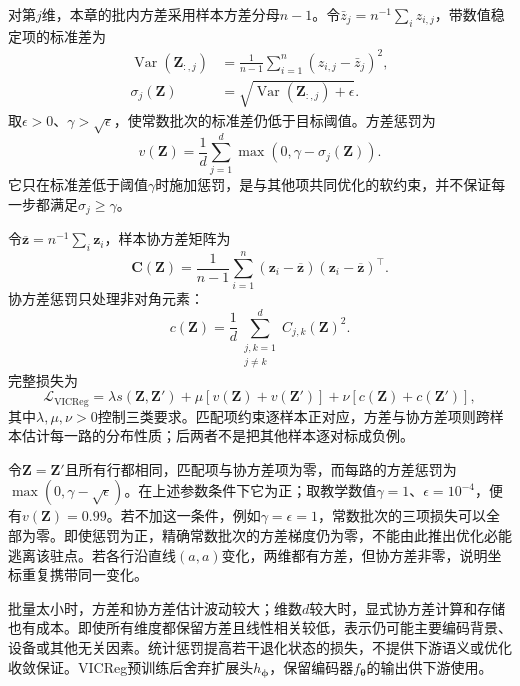 对第$j$维，本章的批内方差采用样本方差分母$n-1$。令$\bar z_j=n^{-1}\sum_i z_{i,j}$，带数值稳定项的标准差为
\[
  \begin{aligned}
    \operatorname{Var}(\bm{Z}_{:,j})
    &=\frac{1}{n-1}\sum_{i=1}^{n}(z_{i,j}-\bar z_j)^2,\\
    \sigma_j(\bm{Z})
    &=\sqrt{\operatorname{Var}(\bm{Z}_{:,j})+\epsilon}.
  \end{aligned}
\]
取$\epsilon>0$、$\gamma>\sqrt{\epsilon}$，使常数批次的标准差仍低于目标阈值。方差惩罚为
\begin{equation}
  v(\bm{Z})
  =\frac{1}{d}\sum_{j=1}^{d}\max(0,\gamma-\sigma_j(\bm{Z})).
  \label{eq:data-derived-knowledge-vicreg-variance}
\end{equation}
它只在标准差低于阈值$\gamma$时施加惩罚，是与其他项共同优化的软约束，并不保证每一步都满足$\sigma_j\geq\gamma$。

令$\overline{\bm{z}}=n^{-1}\sum_i\bm{z}_i$，样本协方差矩阵为
\[
  \bm{C}(\bm{Z})
  =\frac{1}{n-1}\sum_{i=1}^{n}
  (\bm{z}_i-\overline{\bm{z}})
  (\bm{z}_i-\overline{\bm{z}})^{\top}.
\]
协方差惩罚只处理非对角元素：
\begin{equation}
  c(\bm{Z})
  =\frac{1}{d}\sum_{\substack{j,k=1\\j\neq k}}^{d}C_{j,k}(\bm{Z})^2.
  \label{eq:data-derived-knowledge-vicreg-covariance}
\end{equation}
完整损失为
\begin{equation}
  \mathcal{L}_{\mathrm{VICReg}}
  =\lambda s(\bm{Z},\bm{Z}')
  +\mu\!\left[v(\bm{Z})+v(\bm{Z}')\right]
  +\nu\!\left[c(\bm{Z})+c(\bm{Z}')\right],
  \label{eq:data-derived-knowledge-vicreg}
\end{equation}
其中$\lambda,\mu,\nu>0$控制三类要求。匹配项约束逐样本正对应，方差与协方差项则跨样本估计每一路的分布性质；后两者不是把其他样本逐对标成负例。

令$\bm{Z}=\bm{Z}'$且所有行都相同，匹配项与协方差项为零，而每路的方差惩罚为$\max(0,\gamma-\sqrt{\epsilon})$。在上述参数条件下它为正；取教学数值$\gamma=1$、$\epsilon=10^{-4}$，便有$v(\bm{Z})=0.99$。若不加这一条件，例如$\gamma=\epsilon=1$，常数批次的三项损失可以全部为零。即使惩罚为正，精确常数批次的方差梯度仍为零，不能由此推出优化必能逃离该驻点。若各行沿直线$(a,a)$变化，两维都有方差，但协方差非零，说明坐标重复携带同一变化。

批量太小时，方差和协方差估计波动较大；维数$d$较大时，显式协方差计算和存储也有成本。即使所有维度都保留方差且线性相关较低，表示仍可能主要编码背景、设备或其他无关因素。统计惩罚提高若干退化状态的损失，不提供下游语义或优化收敛保证。VICReg预训练后舍弃扩展头$h_{\bm{\phi}}$，保留编码器$f_{\bm{\theta}}$的输出供下游使用。

